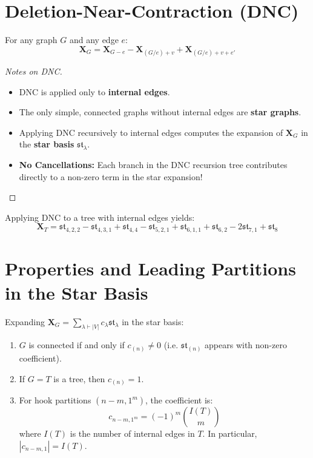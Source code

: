 \documentclass[12pt]{memoir}
\begin{document}
\newpage

\section{Deletion-Near-Contraction (DNC)}

\begin{ptcb}
\begin{Th}
For any graph $G$ and any edge $e$:
\[
\mathbf{X}_G = \mathbf{X}_{G-e} - \mathbf{X}_{(G/e)+v} + \mathbf{X}_{(G/e)+v+e'}
\]
\end{Th}
\end{ptcb}

\begin{proof}[Notes on DNC]
\begin{itemize}
    \item DNC is applied only to \textbf{internal edges}.
    \item The only simple, connected graphs without internal edges are \textbf{star graphs}.
    \item Applying DNC recursively to internal edges computes the expansion of $\mathbf{X}_G$ in the \textbf{star basis} $\mathfrak{st}_\lambda$.
    \item \textbf{No Cancellations:} Each branch in the DNC recursion tree contributes directly to a non-zero term in the star expansion!
\end{itemize}
\end{proof}

\begin{Ex}
Applying DNC to a tree with internal edges yields:
\[
\mathbf{X}_T = \mathfrak{st}_{4,2,2} - \mathfrak{st}_{4,3,1} + \mathfrak{st}_{4,4} - \mathfrak{st}_{5,2,1} + \mathfrak{st}_{6,1,1} + \mathfrak{st}_{6,2} - 2 \mathfrak{st}_{7,1} + \mathfrak{st}_8
\]
\end{Ex}

\newpage

\section{Properties and Leading Partitions in the Star Basis}

Expanding $\mathbf{X}_G = \sum_{\lambda \vdash |V|} c_\lambda \mathfrak{st}_\lambda$ in the star basis:

\begin{ptcb}
\begin{Prop}
\begin{enumerate}
    \item $G$ is connected if and only if $c_{(n)} \neq 0$ (i.e. $\mathfrak{st}_{(n)}$ appears with non-zero coefficient).
    \item If $G = T$ is a tree, then $c_{(n)} = 1$.
    \item For hook partitions $(n-m, 1^m)$, the coefficient is:
    \[
    c_{n-m, 1^m} = (-1)^m \binom{I(T)}{m}
    \]
    where $I(T)$ is the number of internal edges in $T$. In particular, $|c_{n-m, 1}| = I(T)$.
\end{enumerate}
\end{Prop}
\end{ptcb}
\end{document}
